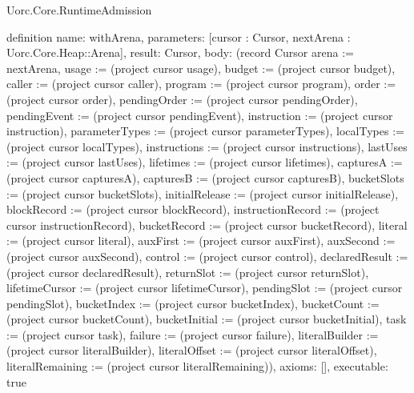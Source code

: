 \begin{lexlean}{Uorc.Core.RuntimeAdmission}
\begin{semanticmodule}
definition{
  name: withArena,
  parameters: [cursor : Cursor, nextArena : Uorc.Core.Heap::Arena],
  result: Cursor,
  body: (record Cursor {arena := nextArena, usage := (project cursor usage), budget := (project cursor budget), caller := (project cursor caller), program := (project cursor program), order := (project cursor order), pendingOrder := (project cursor pendingOrder), pendingEvent := (project cursor pendingEvent), instruction := (project cursor instruction), parameterTypes := (project cursor parameterTypes), localTypes := (project cursor localTypes), instructions := (project cursor instructions), lastUses := (project cursor lastUses), lifetimes := (project cursor lifetimes), capturesA := (project cursor capturesA), capturesB := (project cursor capturesB), bucketSlots := (project cursor bucketSlots), initialRelease := (project cursor initialRelease), blockRecord := (project cursor blockRecord), instructionRecord := (project cursor instructionRecord), bucketRecord := (project cursor bucketRecord), literal := (project cursor literal), auxFirst := (project cursor auxFirst), auxSecond := (project cursor auxSecond), control := (project cursor control), declaredResult := (project cursor declaredResult), returnSlot := (project cursor returnSlot), lifetimeCursor := (project cursor lifetimeCursor), pendingSlot := (project cursor pendingSlot), bucketIndex := (project cursor bucketIndex), bucketCount := (project cursor bucketCount), bucketInitial := (project cursor bucketInitial), task := (project cursor task), failure := (project cursor failure), literalBuilder := (project cursor literalBuilder), literalOffset := (project cursor literalOffset), literalRemaining := (project cursor literalRemaining)}),
  axioms: [],
  executable: true
}


\end{semanticmodule}
\end{lexlean}
